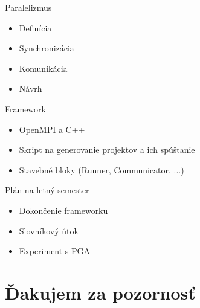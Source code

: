 \documentclass{beamer}
\begin{document}
\begin{frame}{Paralelizmus}
  \begin{itemize}
      \item Definícia
      \item Synchronizácia
      \item Komunikácia
      \item Návrh
    \end{itemize}
\end{frame}

\begin{frame}{Framework}
  \begin{itemize}
      \item OpenMPI a C++
      \item Skript na generovanie projektov a ich spúštanie
      \item Stavebné bloky (Runner, Communicator, ...)
    \end{itemize}
\end{frame}

\begin{frame}{Plán na letný semester}
	\begin{itemize}
  		\item Dokončenie frameworku
  		\item Slovníkový útok
  		\item Experiment s PGA
  	\end{itemize}
\end{frame}

\section{Ďakujem za pozornosť}
\end{document}
